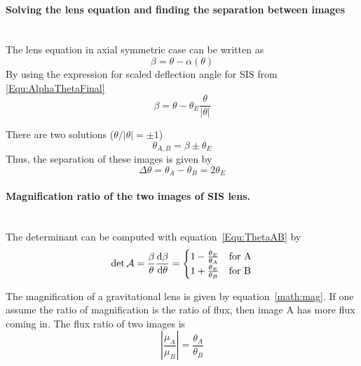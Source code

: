  \paragraph{Solving the lens equation and finding the separation between images}\hspace{0pt} \\
 The lens equation in axial symmetric case can be written as
 \begin{equation*}
 \beta=\theta-\alpha(\theta)
 \end{equation*}
 By using the expression for scaled deflection angle for SIS from \ref{Equ:AlphaThetaFinal}
 \begin{equation*}
 \beta=\theta-\theta_{E} \frac{\theta}{|\theta|}
 \end{equation*}

 There are two solutions ($\theta/|\theta| = \pm 1$)
 \begin{equation}
 \theta_{A, B}=\beta \pm \theta_{E}
 \label{Equ:ThetaAB}
 \end{equation}
 Thus, the separation of these  images is given by
 \begin{equation}
 \Delta\theta= \theta_{A}- \theta_{B} = 2\theta_{E}
 \label{math:imSep}
 \end{equation}
 
 \paragraph{Magnification ratio of the two images of SIS lens.}\hspace{0pt}\\
 The determinant can be computed with equation~\ref{Equ:ThetaAB} by
 \begin{equation}
	 \det \mathcal{A} = \frac{\beta}{\theta}\dv{\beta}{\theta} 
							= 
							\begin{cases}
								1 - \frac{\theta_E}{\theta_A} & \text{for A} \\
								1 + \frac{\theta_E}{\theta_B} & \text{for B}
							\end{cases}
 \end{equation}

 The magnification of a gravitational lens is given by equation~\ref{math:mag}. If one assume the ratio of magnification is the ratio of flux, then image A has more flux coming in. The flux ratio of two images is
 \begin{equation}
	 \left| \frac{\mu_A}{\mu_B} \right| = \frac{\theta_A}{\theta_B}
 \end{equation}
 
